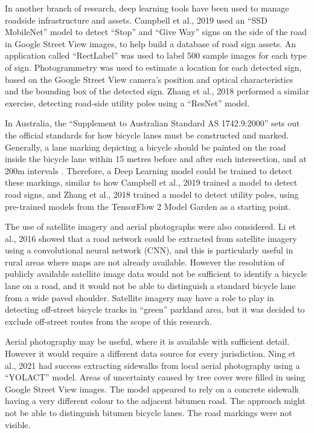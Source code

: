\documentclass[11pt,twoside]{report}
\begin{document}
In another branch of research, deep learning tools have been used to manage roadside infrastructure and assets.  Campbell et al., 2019 \cite{CAMPBELL2019101350} used an ``SSD MobileNet'' model to detect ``Stop'' and ``Give Way'' signs on the side of the road in Google Street View images, to help build a database of road sign assets.  An application called ``RectLabel'' was used to label 500 sample images for each type of sign.  Photogrammetry was used to estimate a location for each detected sign, based on the Google Street View camera's position and optical characteristics and the bounding box of the detected sign.  Zhang et al., 2018 \cite{s18082484} performed a similar exercise, detecting road-side utility poles using a ``ResNet'' model.

In Australia, the ``Supplement to Australian Standard AS 1742.9:2000'' sets out the official standards for how bicycle lanes must be constructed and marked.  Generally, a lane marking depicting a bicycle should be painted on the road inside the bicycle lane within 15 metres before and after each intersection, and at 200m intervals \cite{standards}.  Therefore, a Deep Learning model could be trained to detect these markings, similar to how Campbell et al., 2019 \cite{CAMPBELL2019101350} trained a model to detect road signs, and Zhang et al., 2018 \cite{s18082484} trained a model to detect utility poles, using pre-trained models from the TensorFlow 2 Model Garden \cite{zoo} as a starting point.

The use of satellite imagery and aerial photographs were also considered.  Li et al., 2016 \cite{ROADNETWORK} showed that a road network could be extracted from satellite imagery using a convolutional neural network (CNN), and this is particularly useful in rural areas where maps are not already available.  However the resolution of publicly available satellite image data would not be sufficient to identify a bicycle lane on a road, and it would not be able to distinguish a standard bicycle lane from a wide paved shoulder.  Satellite imagery may have a role to play in detecting off-street bicycle tracks in ``green'' parkland area, but it was decided to exclude off-street routes from the scope of this research.

Aerial photography may be useful, where it is available with sufficient detail.  However it would require a different data source for every jurisdiction.  Ning et al., 2021 \cite{NING2021} had success extracting sidewalks from local aerial photography using a ``YOLACT'' model.  Areas of uncertainty caused by tree cover were filled in using Google Street View images.  The model appeared to rely on a concrete sidewalk having a very different colour to the adjacent bitumen road.  The approach might not be able to distinguish bitumen bicycle lanes.  The road markings were not visible.
\end{document}
